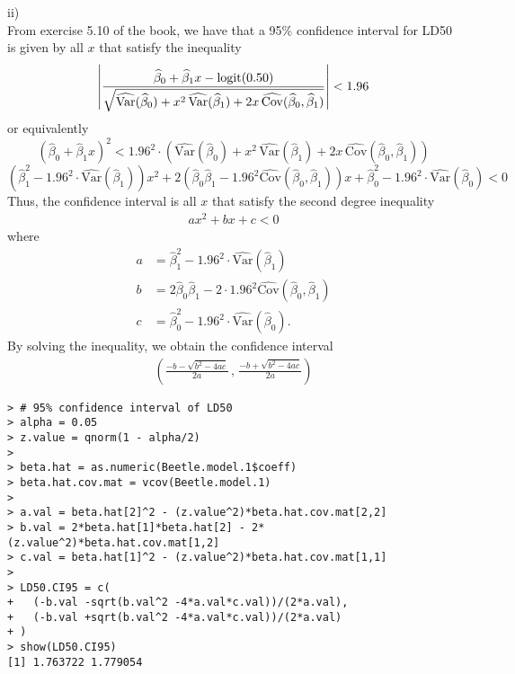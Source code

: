 \documentclass[a4paper]{article}
\newcommand{\Var}{\mathrm{Var}}
\newcommand{\Cov}{\mathrm{Cov}}
\begin{document}
ii)\\
From exercise 5.10 of the book, we have that a 95{\%} confidence interval for LD50 is given by all $x$ that satisfy the inequality
%
\begin{align*}
\left| \frac{\widehat{\beta}_0+\widehat{\beta}_1 x-{\rm logit}(0.50)}{\sqrt{\widehat{\Var}(\widehat{\beta}_0)+x^{2} \, \widehat{\Var}(\widehat{\beta}_1)+
2x\, \widehat{\Cov}(\widehat{\beta}_0,\widehat{\beta}_1)}}\right| < 1.96
\end{align*}
or equivalently
\[
\left(\widehat{\beta}_{0}+\widehat{\beta}_{1} x \right)^{2} < 1.96^{2}\cdot \left(\widehat{\Var}(\widehat{\beta}_{0}) + {x}^{2} \, \widehat{\Var}(\widehat{\beta}_{1}) + 2x \, \widehat{\Cov}(\widehat{\beta}_{0},\widehat{\beta}_{1})\right)\]
\[
\left(\widehat{\beta}_{1}^{2} -1.96^{2}\cdot \widehat{\Var}(\widehat{\beta}_{1})\right) x^{2} + 2\left(\widehat{\beta}_{0} \widehat{\beta}_{1} -1.96^{2} \widehat{\Cov}(\widehat{\beta}_{0},\widehat{\beta}_{1})\right) x + \widehat{\beta}_{0}^{2} -1.96^{2}\cdot \widehat{\Var}(\widehat{\beta}_{0}) < 0
\]
Thus, the confidence interval is all $x$ that satisfy the second degree inequality
\begin{align*}
ax^2+bx+c<0
\end{align*}
where
\begin{align*}
a &= \widehat{\beta}_{1}^{2} -1.96^{2}\cdot \widehat{\Var}(\widehat{\beta}_{1})\\
b &= 2\widehat{\beta}_{0} \widehat{\beta}_{1} -2\cdot 1.96^{2} \widehat{\Cov}(\widehat{\beta}_{0},\widehat{\beta}_{1})\\
c &= \widehat{\beta}_{0}^{2} -1.96^{2}\cdot \widehat{\Var}(\widehat{\beta}_{0}).
\end{align*}
By solving the inequality, we obtain the confidence interval
\begin{align*}
\left(\frac{-b-\sqrt{b^2 -4ac}}{2a} \, , \, \frac{-b+\sqrt{b^2 -4ac}}{2a}\right)
\end{align*}

\begin{lstlisting}
> # 95% confidence interval of LD50
> alpha = 0.05
> z.value = qnorm(1 - alpha/2)
> 
> beta.hat = as.numeric(Beetle.model.1$coeff)
> beta.hat.cov.mat = vcov(Beetle.model.1) 
> 
> a.val = beta.hat[2]^2 - (z.value^2)*beta.hat.cov.mat[2,2]
> b.val = 2*beta.hat[1]*beta.hat[2] - 2*(z.value^2)*beta.hat.cov.mat[1,2]
> c.val = beta.hat[1]^2 - (z.value^2)*beta.hat.cov.mat[1,1]
> 
> LD50.CI95 = c(
+   (-b.val -sqrt(b.val^2 -4*a.val*c.val))/(2*a.val),
+   (-b.val +sqrt(b.val^2 -4*a.val*c.val))/(2*a.val)
+ )
> show(LD50.CI95)
[1] 1.763722 1.779054
\end{lstlisting}
\end{document}
